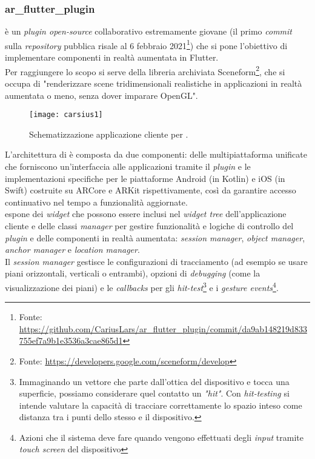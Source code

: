 \subsubsection{ar\_flutter\_plugin}
\aplug{} è un \textit{plugin open-source} collaborativo estremamente giovane (il primo \textit{commit} sulla \textit{repository} pubblica risale al 6 febbraio 2021\footnote{Fonte: \url{https://github.com/CariusLars/ar_flutter_plugin/commit/da9ab148219d833755ef7a9b1e3536a3cae865d1}}) che si pone l'obiettivo di implementare componenti in realtà aumentata in Flutter.\\
Per raggiungere lo scopo si serve della libreria archiviata Sceneform\footnote{Fonte: \url{https://developers.google.com/sceneform/develop}}, che si occupa di "renderizzare scene tridimensionali realistiche in applicazioni in realtà aumentata o meno, senza dover imparare OpenGL".\\

\begin{figure}[H]
  \centering
  \texttt{[image: carsius1]}
  \caption[Applicazione realtà aumentata \aplug{}]{Schematizzazione applicazione cliente per \aplug{}.\footnotemark}
\end{figure}

L'architettura di \aplug{} è composta da due componenti: delle \api{} multipiattaforma unificate che forniscono un'interfaccia alle applicazioni tramite il \textit{plugin} e le implementazioni specifiche per le piattaforme Android (in Kotlin) e iOS (in Swift) costruite su ARCore e ARKit rispettivamente, così da garantire accesso continuativo nel tempo a funzionalità aggiornate.\\
\aplug{} espone dei \textit{widget} che possono essere inclusi nel \textit{widget tree} dell'applicazione cliente e delle classi \textit{manager} per gestire funzionalità e logiche di controllo del \textit{plugin} e delle componenti in realtà aumentata: \textit{session manager}, \textit{object manager}, \textit{anchor manager} e \textit{location manager}.\\ 
Il \textit{session manager} gestisce le configurazioni di tracciamento (ad esempio se usare piani orizzontali, verticali o entrambi), opzioni di \textit{debugging} (come la visualizzazione dei piani) e le \textit{callbacks} per gli \textit{hit-test}\footnote{Immaginando un vettore che parte dall'ottica del dispositivo e tocca una superficie, possiamo considerare quel contatto un \textit{"hit"}. Con \textit{hit-testing} si intende valutare la capacità di tracciare correttamente lo spazio inteso come distanza tra i punti dello stesso e il dispositivo.} e i \textit{gesture events}\footnote{Azioni che il sistema deve fare quando vengono effettuati degli \textit{input} tramite \textit{touch screen} del dispositivo}.\\

